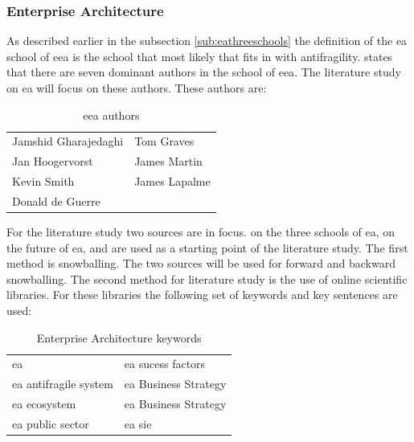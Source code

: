 \subsubsection{Enterprise Architecture}
\label{subsub:enterprisearchitecture}
As described earlier in the subsection \ref{sub:eathreeschools} the definition of the \acrfull{ea} school of \acrfull{eea} is the school that most likely that fits in with \gls{antifragility}. \textcite[p. 42]{Lapalme2012} states that there are seven dominant authors in the school of \acrshort{eea}.  The literature study on \acrshort{ea} will focus on these authors. These authors are:
\begin{table}[H]
	\centering
	\begin{tabular}{p{}p{}}
		\toprule
		Jamshid Gharajedaghi & Tom Graves \\%
		Jan Hoogervorst	& James Martin \\%
		Kevin Smith & James Lapalme\\%
		Donald de Guerre &  \\%
		\bottomrule
	\end{tabular}
	\caption{\acrfull{eea} authors \parencite[p.~42]{Lapalme2012}}
	\label{tab:eeaauthors2}
\end{table}
For the literature study two sources are in focus. \textcite{Lapalme2012} on the three schools of \acrshort{ea}, \textcite{Lapalme2016} on the future of \acrshort{ea}, and \textcite{Graves2008} are used as a starting point of the literature study. The first method is snowballing. The two sources will be used for forward and backward snowballing. The second method for literature study is the use of online scientific libraries. For these libraries the following set of keywords and key sentences are used:
\begin{table}[H]
	\centering
	\begin{tabular}{p{}p{}}
		\toprule
		\acrlong{ea} & \acrlong{ea} sucess factors\\%
		\acrlong{ea} \gls{antifragile} system	& \acrlong{ea} Business Strategy\\%
		\acrlong{ea} ecosystem & \acrlong{ea} Business Strategy\\%
		\acrlong{ea} public sector & \acrlong{ea} \acrlong{sie} \\%
		\bottomrule
	\end{tabular}
	\caption{Enterprise Architecture keywords}
	\label{tab:enterprisearchitecturekeywords}
\end{table}
